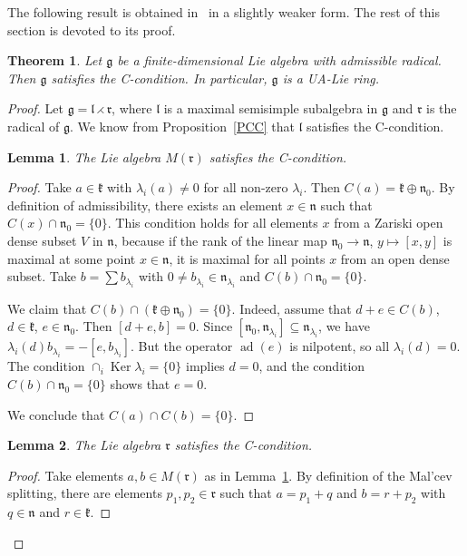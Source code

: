 \documentclass[a4paper,draft,reqno,12pt]{amsart}
\newtheorem{lemma}{Lemma}
\newtheorem{theorem}{Theorem}
\theoremstyle{definition}
\theoremstyle{remark}
\DeclareMathOperator{\ad}{ad}
\DeclareMathOperator{\Ker}{Ker}
\def\ggg{\mathfrak{g}}
\def\nnn{\mathfrak{n}}
\def\kkk{\mathfrak{k}}
\def\lll{\mathfrak{l}}
\def\rrr{\mathfrak{r}}
\begin{document}
The following result is obtained in~\cite{AT} in a slightly weaker form. The rest of this section is devoted to its proof.

\begin{theorem}
\label{tar}
Let $\ggg$ be a finite-dimensional Lie algebra with admissible radical. Then $\ggg$ satisfies the C-condition. In particular, $\ggg$ is a UA-Lie ring. 
\end{theorem}

\begin{proof}
Let $\ggg=\lll\rightthreetimes\rrr$, where $\lll$ is a maximal semisimple subalgebra in $\ggg$ and $\rrr$ is the radical of $\ggg$. We know from Proposition~\ref{PCC} that $\lll$ satisfies the C-condition. 

\begin{lemma}
\label{ll1}
The Lie algebra $M(\rrr)$ satisfies the C-condition. 
\end{lemma}

\begin{proof}
Take $a\in\kkk$ with $\lambda_i(a)\ne 0$ for all non-zero $\lambda_i$. Then $C(a)=\kkk\oplus\nnn_0$. By definition of admissibility, there exists an element $x\in\nnn$ such that 
$C(x)\cap\nnn_0=\{0\}$. This condition holds for all elements $x$ from a Zariski open dense subset $V$ in $\nnn$, because if the rank of the linear map $\nnn_0\to\nnn$, $y\mapsto [x,y]$ 
is maximal at some point $x\in\nnn$, it is maximal for all points $x$ from an open dense subset. Take $b=\sum b_{\lambda_i}$ with $0\ne b_{\lambda_i}\in\nnn_{\lambda_i}$ and
$C(b)\cap\nnn_0=\{0\}$. 

We claim that $C(b)\cap(\kkk\oplus\nnn_0)=\{0\}$. Indeed, assume that $d+e\in C(b)$, $d\in\kkk$, $e\in\nnn_0$. Then $[d+e,b]=0$. Since $[\nnn_0,\nnn_{\lambda_i}]\subseteq\nnn_{\lambda_i}$, we have $\lambda_i(d)b_{\lambda_i}=-[e,b_{\lambda_i}]$. But the operator $\ad(e)$ is nilpotent, so all $\lambda_i(d)=0$. The condition $\cap_i\Ker\lambda_i=\{0\}$ implies $d=0$, and the condition $C(b)\cap\nnn_0=\{0\}$ shows that $e=0$. 

We conclude that $C(a)\cap C(b)=\{0\}$. 
\end{proof}

\begin{lemma}
The Lie algebra $\rrr$ satisfies the C-condition. 
\end{lemma}

\begin{proof}
Take elements $a,b\in M(\rrr)$ as in Lemma~\ref{ll1}. By definition of the Mal'cev splitting, there are elements $p_1,p_2\in\rrr$ such that $a=p_1+q$ and $b=r+ p_2$ with $q\in\nnn$
and $r\in\kkk$. 


\end{proof}
\end{proof}
\end{document}
